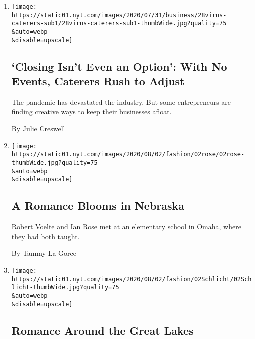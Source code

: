 \begin{enumerate}
\def\labelenumi{\arabic{enumi}.}
\item
  \href{/2020/08/04/business/coronavirus-struggling-caterers.html}{}

  \texttt{[image: https://static01.nyt.com/images/2020/07/31/business/28virus-caterers-sub1/28virus-caterers-sub1-thumbWide.jpg?quality=75\\\&auto=webp\\\&disable=upscale]}

  \hypertarget{closing-isnt-even-an-option-with-no-events-caterers-rush-to-adjust}{%
  \subsection{`Closing Isn't Even an Option': With No Events, Caterers
  Rush to
  Adjust}\label{closing-isnt-even-an-option-with-no-events-caterers-rush-to-adjust}}

  The pandemic has devastated the industry. But some entrepreneurs are
  finding creative ways to keep their businesses afloat.

  By Julie Creswell
\item
  \href{/2020/07/31/fashion/weddings/a-romance-blooms-in-nebraska.html}{}

  \texttt{[image: https://static01.nyt.com/images/2020/08/02/fashion/02rose/02rose-thumbWide.jpg?quality=75\\\&auto=webp\\\&disable=upscale]}

  \hypertarget{a-romance-blooms-in-nebraska}{%
  \subsection{A Romance Blooms in
  Nebraska}\label{a-romance-blooms-in-nebraska}}

  Robert Voelte and Ian Rose met at an elementary school in Omaha, where
  they had both taught.

  By Tammy La Gorce
\item
  \href{/2020/07/31/fashion/weddings/romance-around-the-great-lakes.html}{}

  \texttt{[image: https://static01.nyt.com/images/2020/08/02/fashion/02Schlicht/02Schlicht-thumbWide.jpg?quality=75\\\&auto=webp\\\&disable=upscale]}

  \hypertarget{romance-around-the-great-lakes}{%
  \subsection{Romance Around the Great
  Lakes}\label{romance-around-the-great-lakes}}


\end{enumerate}
